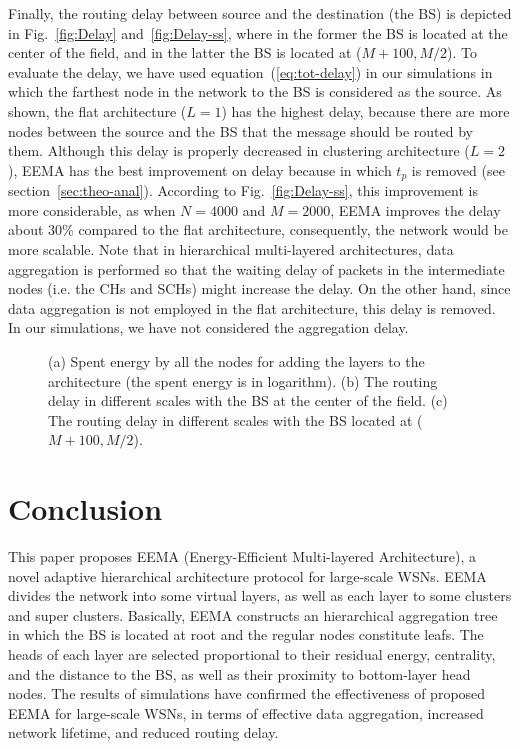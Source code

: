 \documentclass[journal]{IEEEtran}
\begin{document}
Finally, the routing delay between source and the destination (the BS) is depicted in Fig.~\ref{fig:Delay} and~\ref{fig:Delay-ss}, where in the former the BS is located at the center of the field, and in the latter the BS is located at ($M+100,M/2$).
To evaluate the delay, we have used equation~(\ref{eq:tot-delay}) in our simulations in which the farthest node in the network to the BS is considered as the source.  As shown, the flat architecture ($L=1$) has the highest delay, because there are more nodes between the source and the BS that the message should be routed by them.  Although this delay is properly decreased in clustering architecture ($L=2$),
EEMA has the best improvement on delay because in which $t_p$ is removed (see section~\ref{sec:theo-anal}).  
According to Fig.~\ref{fig:Delay-ss}, this improvement is more considerable, as when $N=4000$ and $M=2000$, EEMA improves the delay about 30\% compared to the flat architecture, consequently,  the network would be more scalable.  Note that in hierarchical multi-layered architectures, data aggregation is performed so that the waiting delay of packets in the intermediate nodes (i.e. the CHs and SCHs) might increase the delay.  On the other hand, since data aggregation is not employed in the flat architecture, this delay is removed.  In our simulations, we have not considered the aggregation delay.
\begin{figure*}[t]
	\centering
	\caption[Optional caption for list of figures]{(a) Spent energy by all the nodes for adding the layers to the architecture (the spent energy is in logarithm). (b) The routing delay in different scales with the BS at the center of the field. (c) The routing delay in different scales with the BS located at ($M+100, M/2$).}
	\label{fig:ene-del}
\end{figure*}

\section{Conclusion}
\label{sec:con}
This paper proposes EEMA (Energy-Efficient Multi-layered Architecture), a novel adaptive hierarchical architecture protocol for large-scale WSNs. EEMA divides the network into some virtual layers, as well as each layer to some clusters and super clusters. Basically, EEMA constructs an hierarchical aggregation tree in which the BS is located at root and the regular nodes constitute leafs.  The heads of each layer are selected proportional to their residual energy, centrality, and the distance to the BS, as well as their proximity to bottom-layer head nodes.  The results of simulations have confirmed the effectiveness of proposed EEMA for large-scale WSNs, in terms of effective data aggregation, increased network lifetime, and reduced routing delay.




\end{document}
